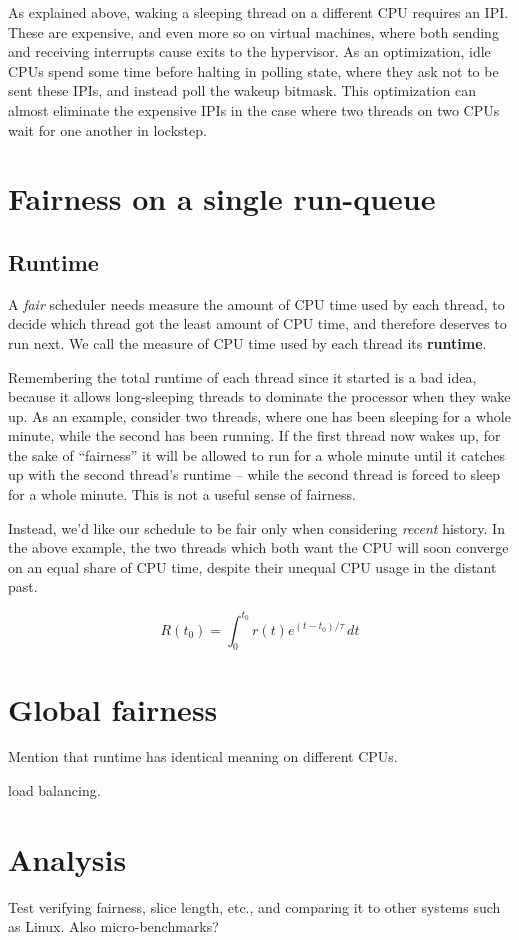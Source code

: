 \documentclass{sig-alternate}
\begin{document}
As explained above, waking a sleeping thread on a different CPU requires
an IPI. These are expensive, and even more so on virtual machines, where
both sending and receiving interrupts cause exits to the hypervisor. As an optimization, idle
CPUs spend some time before halting in polling state, where they ask not to
be sent these IPIs, and instead poll the wakeup bitmask. This optimization
can almost eliminate the expensive IPIs in the case where two
threads on two CPUs wait for one another in lockstep.

\section{Fairness on a single run-queue}
\subsection{Runtime}
A \emph{fair} scheduler needs measure the amount of CPU time used by
each thread, to decide which thread got the least amount of CPU
time, and therefore deserves to run next. We call the measure of CPU time
used by each thread its {\bf runtime}.

Remembering the total runtime of each thread since it started
is a bad idea, because it allows long-sleeping threads to dominate the
processor when they wake up. As an example, consider two threads,
where one has been sleeping for a whole minute, while the second has been
running. If the first thread now wakes up, for the sake of ``fairness''
it will be allowed to run for a whole minute until it catches up with the
second thread's runtime -- while the second thread is forced to sleep for
a whole minute. This is not a useful sense of fairness.

Instead, we'd like our schedule to be fair only when considering \emph{recent}
history. In the above example, the two threads which both want the CPU will
soon converge on an equal share of CPU time, despite their unequal CPU usage
in the distant past.

\begin{equation}
R(t_0) = \int^{t_0}_{0}\!r(t)e^{(t-t_0)/\tau}\,dt
\end{equation}
\section{Global fairness}
Mention that runtime has identical meaning on different CPUs.

load balancing.


\section{Analysis}
Test verifying fairness, slice length, etc., and comparing it to other
systems such as Linux. Also micro-benchmarks?




\end{document}
